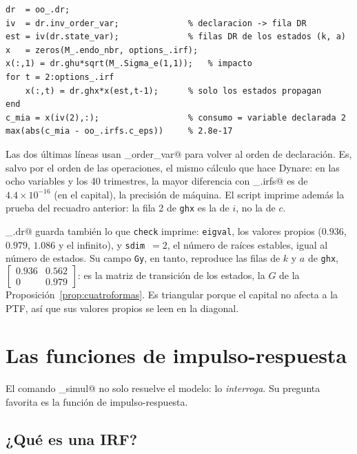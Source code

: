 \documentclass[11pt,a4paper]{report}
\newcounter{tcbrem}[section]
\renewcommand{\thetcbrem}{\thesection.\arabic{tcbrem}}
\newenvironment{remark}{%
  \refstepcounter{tcbrem}%
  \begin{tcolorbox}[remarkstyle, title={Observación~\thetcbrem}]}%
{\end{tcolorbox}}
\newcommand{\code}[1]{\texttt{#1}}
\begin{document}
\begin{lstlisting}[numbers=none,basicstyle=\ttfamily\footnotesize]
dr  = oo_.dr;
iv  = dr.inv_order_var;              % declaracion -> fila DR
est = iv(dr.state_var);              % filas DR de los estados (k, a)
x   = zeros(M_.endo_nbr, options_.irf);
x(:,1) = dr.ghu*sqrt(M_.Sigma_e(1,1));   % impacto
for t = 2:options_.irf
    x(:,t) = dr.ghx*x(est,t-1);      % solo los estados propagan
end
c_mia = x(iv(2),:);                  % consumo = variable declarada 2
max(abs(c_mia - oo_.irfs.c_eps))     % 2.8e-17
\end{lstlisting}

\noindent Las dos últimas líneas usan \lstinline@inv_order_var@ para volver al orden
de declaración. Es, salvo por el orden de las operaciones, el mismo cálculo que hace
Dynare: en las ocho variables y los 40 trimestres, la mayor diferencia con
\lstinline@oo_.irfs@ es de $4.4\times10^{-16}$ (en el capital), la precisión de
máquina. El script imprime además la prueba del recuadro anterior: la fila 2 de
\code{ghx} es la de $i$, no la de $c$.

\begin{remark}
\lstinline@oo_.dr@ guarda también lo que \code{check} imprime: \code{eigval}, los
valores propios ($0.936$, $0.979$, $1.086$ y el infinito), y \code{sdim}~$=2$, el
número de raíces estables, igual al número de estados. Su campo \code{Gy}, en tanto,
reproduce las filas de $k$ y $a$ de \code{ghx},
$\left[\begin{smallmatrix}0.936&0.562\\0&0.979\end{smallmatrix}\right]$: es la matriz
de transición de los estados, la $G$ de la Proposición~\ref{prop:cuatroformas}. Es
triangular porque el capital no afecta a la PTF, así que sus valores propios se leen
en la diagonal.
\end{remark}

\section{Las funciones de impulso-respuesta}
\label{sec:irf}

El comando \lstinline@stoch_simul@ no solo resuelve el modelo: lo
\emph{interroga}. Su pregunta favorita es la función de impulso-respuesta.

\subsection{¿Qué es una IRF?}
\end{document}
